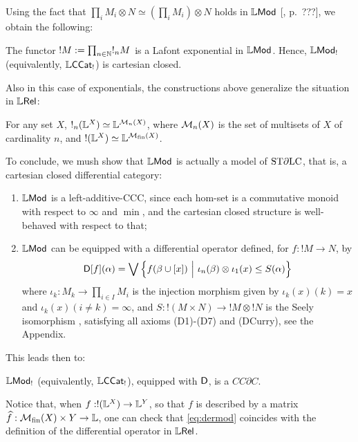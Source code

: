 Using the fact that $\prod_{i}M_{i}\otimes  N\simeq (\prod_{i}M_{i})\otimes N$ holds in $\mathbb{L}\mathsf{Mod}$ [\cite{}, p.~???], we obtain the following:
\begin{theorem}
The functor $!M:= \prod_{n\in \mathbb{N}}!_{n}M$ is a Lafont exponential in $\mathbb{L}\mathsf{Mod}$.
Hence, $\mathbb{L}\mathsf{Mod}_{!}$ (equivalently, $\mathbb{L}\mathsf{CCat}_{!}$) is cartesian closed. 
\end{theorem}

Also in this case of exponentials, the constructions above generalize the situation in $\mathbb{L} \mathsf{Rel}$:
\begin{proposition}
For any set $X$, 
$!_{n}(\mathbb{L}^{X})\simeq \mathbb{L}^{\mathcal{M}_{n}(X)}$, where
$\mathcal{M}_{n}(X)$ is the set of multisets of $X$ of cardinality $n$, and 
$!(\mathbb{L}^{X})\simeq \mathbb{L}^{\mathcal{M}_{\mathrm{fin}}(X)}$. 
\end{proposition}

To conclude, we mush show that $\mathbb{L}\mathsf{Mod}$ is actually a model of $\mathrm{ST}\partial\mathrm{LC}$, that is, a cartesian closed differential category:
\begin{enumerate}
\item $\mathbb{L}\mathsf{Mod}$ is a left-additive-CCC, since each hom-set is a commutative monoid with respect to $\infty$ and $\min$, and the cartesian closed structure is well-behaved with respect to that;

\item $\mathbb{L}\mathsf{Mod}$ can be equipped with a differential operator defined, for $f:!M\to N$, by 
\begin{align}\label{eq:dermod}
\Der[f](\alpha)=
\bigvee\left\{
f(\beta\cup [x]) \ \Big \vert  \ 
\iota_{n}(\beta)\otimes \iota_{1}(x) \leq S(\alpha)
\right\}
\end{align}
where $\iota_{k}: M_{k}\to \prod_{i\in I}M_{i}$ is the injection morphism given by $\iota_{k}(x)( k)=x$ and $\iota_{k}(x)(i\neq k)=\infty$,
and $S: !(M\times N)\to !M\otimes !N$ is the Seely isomorphism \cite{}, 
satisfying all axioms (D1)-(D7) and (DCurry), see the Appendix.
\end{enumerate}

This leads then to:
\begin{theorem}
$\mathbb{L}\mathsf{Mod}_{!}$ (equivalently, $\mathbb{L}\mathsf{CCat}_{!}$), equipped with $\mathsf{D}$, is a $CC\partial C$.
\end{theorem}

Notice that, when $f:!(\mathbb{L}^{X})\to \mathbb{L}^{Y}$, so that $f$ is described by a matrix $\widehat f: \mathcal{M}_{\mathrm{fin}}(X)\times Y\to \mathbb{L}$, one can check that \eqref{eq:dermod} coincides with the definition of the differential operator in $\mathbb{L} \mathsf{Rel}$.





